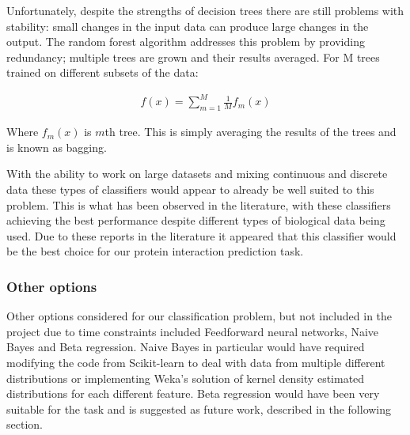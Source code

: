 
Unfortunately, despite the strengths of decision trees there are still problems with stability: small changes in the input data can produce large changes in the output\autocite[550]{murphy_machine_2012}.
The random forest algorithm addresses this problem by providing redundancy; multiple trees are grown and their results averaged.
For M trees trained on different subsets of the data\autocite[551]{murphy_machine_2012}:

\begin{align}
    f(x) = \sum_{m=1}^{M} \frac{1}{M} f_{m}(x)
\end{align}

Where $f_{m}(x)$ is $m$th tree. This is simply averaging the results of the trees and is known as bagging.

With the ability to work on large datasets and mixing continuous and discrete data these types of classifiers would appear to already be well suited to this problem.
This is what has been observed in the literature, with these classifiers achieving the best performance despite different types of biological data being used\autocites{qi_evaluation_2006,rodgers-melnick_predicting_2013}.
Due to these reports in the literature it appeared that this classifier would be the best choice for our protein interaction prediction task.


\subsubsection*{Other options}

Other options considered for our classification problem, but not included in the project due to time constraints included Feedforward neural networks, Naive Bayes and Beta regression.
Naive Bayes in particular would have required modifying the code from Scikit-learn to deal with data from multiple different distributions or implementing Weka's solution of kernel density estimated distributions for each different feature\autocite{john_estimating_1995}.
Beta regression would have been very suitable for the task and is suggested as future work, described in the following section.

